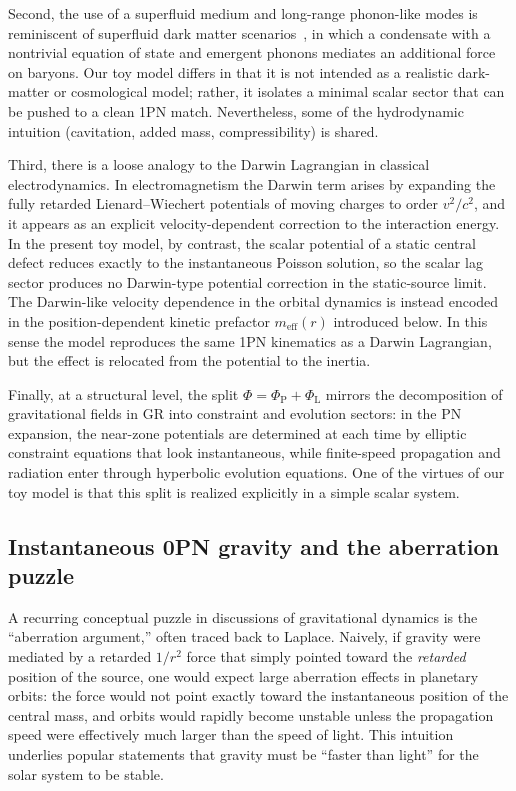 \documentclass[11pt]{article}
\newcommand{\PhiP}{\Phi_{\mathrm{P}}}
\newcommand{\PhiL}{\Phi_{\mathrm{L}}}
\newcommand{\PhiTot}{\Phi}
\begin{document}
Second, the use of a superfluid medium and long-range phonon-like modes is reminiscent of superfluid dark matter scenarios~\cite{Berezhiani:2015bqa,Berezhiani:2015pia}, in which a condensate with a nontrivial equation of state and emergent phonons mediates an additional force on baryons. Our toy model differs in that it is not intended as a realistic dark-matter or cosmological model; rather, it isolates a minimal scalar sector that can be pushed to a clean 1PN match. Nevertheless, some of the hydrodynamic intuition (cavitation, added mass, compressibility) is shared.

Third, there is a loose analogy to the Darwin Lagrangian in classical electrodynamics. In electromagnetism the Darwin term arises by expanding the fully retarded Lienard--Wiechert potentials of moving charges to order $v^2/c^2$, and it appears as an explicit velocity-dependent correction to the interaction energy. In the present toy model, by contrast, the scalar potential of a static central defect reduces exactly to the instantaneous Poisson solution, so the scalar lag sector produces no Darwin-type potential correction in the static-source limit. The Darwin-like velocity dependence in the orbital dynamics is instead encoded in the position-dependent kinetic prefactor $m_{\mathrm{eff}}(r)$ introduced below. In this sense the model reproduces the same 1PN kinematics as a Darwin Lagrangian, but the effect is relocated from the potential to the inertia.

Finally, at a structural level, the split $\PhiTot = \PhiP + \PhiL$ mirrors the decomposition of gravitational fields in GR into constraint and evolution sectors: in the PN expansion, the near-zone potentials are determined at each time by elliptic constraint equations that look instantaneous, while finite-speed propagation and radiation enter through hyperbolic evolution equations. One of the virtues of our toy model is that this split is realized explicitly in a simple scalar system.

\subsection{Instantaneous 0PN gravity and the aberration puzzle}
\label{sec:intro_aberration}

A recurring conceptual puzzle in discussions of gravitational dynamics is the ``aberration argument,'' often traced back to Laplace. Naively, if gravity were mediated by a retarded $1/r^2$ force that simply pointed toward the \emph{retarded} position of the source, one would expect large aberration effects in planetary orbits: the force would not point exactly toward the instantaneous position of the central mass, and orbits would rapidly become unstable unless the propagation speed were effectively much larger than the speed of light. This intuition underlies popular statements that gravity must be ``faster than light'' for the solar system to be stable.
\end{document}
